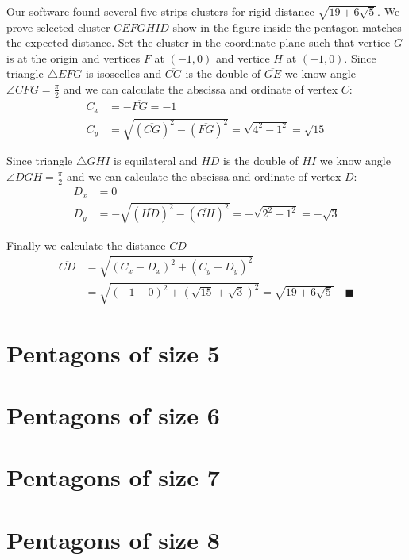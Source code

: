 \documentclass[11pt]{article}
\begin{document}
Our software found several five strips clusters for rigid distance $\sqrt{19+6\sqrt5}$. We prove selected cluster $CEFGHID$ show in the figure inside the pentagon matches the expected distance. Set the cluster in the coordinate plane such that vertice $G$ is at the origin and vertices $F$ at $(-1,0)$ and vertice $H$ at $(+1,0)$.
Since triangle $\triangle{EFG}$ is isoscelles and $\overline{CG}$ is the double of $\overline{GE}$ we know angle $\angle{CFG} = \frac{\pi}2$ and we can calculate the abscissa and ordinate of vertex $C$:
\begin{align}
C_x &= -\overline{FG} = -1 \\
C_y &= \sqrt{(\overline{CG})^2 - (\overline{FG})^2} = \sqrt{4^2 - 1^2} = \sqrt{15}
\end{align}

Since triangle $\triangle{GHI}$ is equilateral and $\overline{HD}$ is the double of $\overline{HI}$ we know angle $\angle{DGH} = \frac{\pi}2$ and we can calculate the abscissa and ordinate of vertex $D$:
\begin{align}
D_x &= 0 \\
D_y &= -\sqrt{(\overline{HD})^2 - (\overline{GH})^2} = -\sqrt{2^2 - 1^2} = -\sqrt3
\end{align}

Finally we calculate the distance $\overline{CD}$
\begin{align}
\overline{CD} &= \sqrt{(C_x - D_x)^2 + (C_y - D_y)^2} \nonumber\\
 &= \sqrt{(-1 - 0)^2 + (\sqrt{15} + \sqrt{3})^2} = \sqrt{19 + 6\sqrt5} \quad\blacksquare
\end{align}


\section{Pentagons of size 5}


\section{Pentagons of size 6}


\section{Pentagons of size 7}


\section{Pentagons of size 8}
\end{document}
